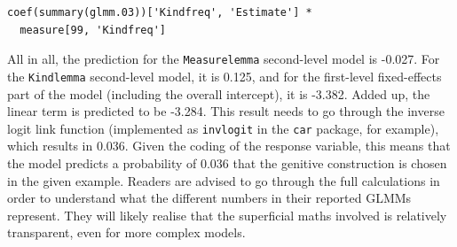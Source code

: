 \vspace{0.5\baselineskip}

\begin{lstlisting}
coef(summary(glmm.03))['Kindfreq', 'Estimate'] *
  measure[99, 'Kindfreq']
\end{lstlisting}

All in all, the prediction for the \texttt{Measurelemma} second-level model is -0.027.
For the \texttt{Kindlemma} second-level model, it is 0.125, and for the first-level fixed-effects part of the model (including the overall intercept), it is -3.382.
Added up, the linear term is predicted to be -3.284.
This result needs to go through the inverse logit link function (implemented as \texttt{invlogit} in the \texttt{car} package, for example), which results in 0.036.
Given the coding of the response variable, this means that the model predicts a probability of 0.036 that the genitive construction is chosen in the given example.
Readers are advised to go through the full calculations in order to understand what the different numbers in their reported GLMMs represent.
They will likely realise that the superficial maths involved is relatively transparent, even for more complex models.
